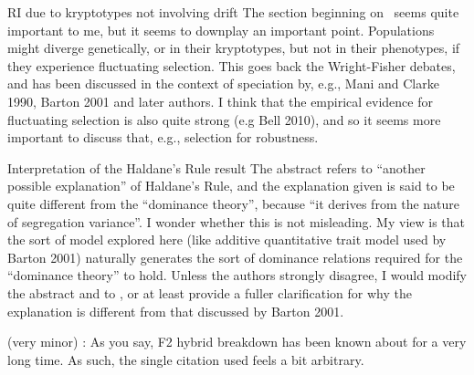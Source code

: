 \begin{point}{RI due to kryptotypes not involving drift}
%
  The section beginning on ~seems quite important to me, but it seems to downplay an important point. Populations might diverge genetically, or in their kryptotypes, but not in their phenotypes, if they experience fluctuating selection. This goes back the Wright-Fisher debates, and has been discussed in the context of speciation by, e.g., Mani and Clarke 1990, Barton 2001 and later authors. I think that the empirical evidence for fluctuating selection is also quite strong (e.g Bell 2010), and so it seems more important to discuss that, e.g., selection for robustness.
\end{point}


\begin{point}{Interpretation of the Haldane’s Rule result}
  The abstract refers to ``another possible explanation'' of Haldane's Rule, and the explanation given is said to be quite different from the ``dominance theory'', because ``it derives from the nature of segregation variance''.  I wonder whether this is not misleading. My view is that the sort of model explored here (like additive quantitative trait model used by Barton 2001) naturally generates the sort of dominance relations required for the ``dominance theory'' to hold. Unless the authors strongly disagree, I would modify the abstract and  to , or at least provide a fuller clarification for why the explanation is different from that discussed by Barton 2001.
\end{point}


\begin{point}{}
  (very minor) : As you say, F2 hybrid breakdown has been known about for a very long time. As such, the single citation used feels a bit arbitrary.
\end{point}

